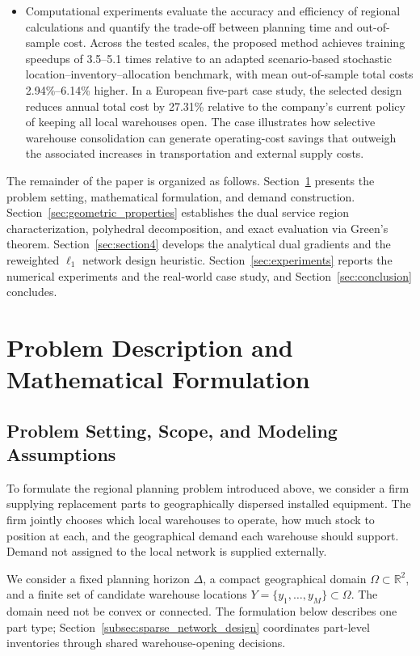 \documentclass[a4paper,fleqn]{cas-sc}
\theoremstyle{remark}
\theoremstyle{plain}
\begin{document}
\begin{itemize}
    \item
    Computational experiments evaluate the accuracy and efficiency of regional calculations and quantify the trade-off between planning time and out-of-sample cost. Across the tested scales, the proposed method achieves training speedups of 3.5--5.1 times relative to an adapted scenario-based stochastic location--inventory--allocation benchmark, with mean out-of-sample total costs 2.94\%--6.14\% higher. In a European five-part case study, the selected design reduces annual total cost by 27.31\% relative to the company's current policy of keeping all local warehouses open. The case illustrates how selective warehouse consolidation can generate operating-cost savings that outweigh the associated increases in transportation and external supply costs.
\end{itemize}

The remainder of the paper is organized as follows. Section~\ref{sec:section2} presents the problem setting, mathematical formulation, and demand construction. Section~\ref{sec:geometric_properties} establishes the dual service region characterization, polyhedral decomposition, and exact evaluation via Green's theorem. Section~\ref{sec:section4} develops the analytical dual gradients and the reweighted $\ell_1$ network design heuristic. Section~\ref{sec:experiments} reports the numerical experiments and the real-world case study, and Section~\ref{sec:conclusion} concludes.

\section{Problem Description and Mathematical Formulation}\label{sec:section2}

\subsection{Problem Setting, Scope, and Modeling Assumptions}\label{subsec:settiong_assumption}

To formulate the regional planning problem introduced above, we consider a firm supplying replacement parts to geographically dispersed installed equipment. The firm jointly chooses which local warehouses to operate, how much stock to position at each, and the geographical demand each warehouse should support. Demand not assigned to the local network is supplied externally.

We consider a fixed planning horizon $\Delta$, a compact geographical domain $\Omega\subset\mathbb R^2$, and a finite set of candidate warehouse locations $Y=\{y_1,\ldots,y_M\}\subset\Omega$. The domain need not be convex or connected. The formulation below describes one part type; Section~\ref{subsec:sparse_network_design} coordinates part-level inventories through shared warehouse-opening decisions.
\end{document}
